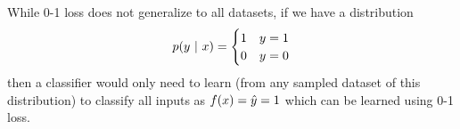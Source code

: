 \tffalse

While 0-1 loss does not generalize to all datasets, if we have a distribution 
$$
p(y ~\vert~ x) = \begin{cases} 1 & y = 1\\ 0 & y = 0 \end{cases}
$$
then a classifier would only need to learn (from any sampled dataset of this distribution) to classify all inputs as $f(x) = \hat{y} = 1$ which can be learned using 0-1 loss.